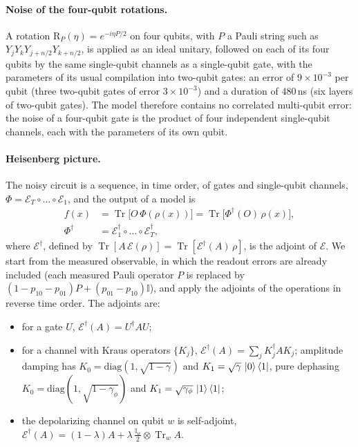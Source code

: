\documentclass[aps,pra,reprint,superscriptaddress,longbibliography]{revtex4-2}
\newcommand{\tr}{\operatorname{Tr}}
\begin{document}
\paragraph{Noise of the four-qubit rotations.} A rotation $\mathrm R_P(\eta)=e^{-i\eta P/2}$ on four qubits, with $P$ a Pauli string such as $Y_jY_kY_{j+n/2}Y_{k+n/2}$, is applied as an ideal unitary, followed on each of its four qubits by the same single-qubit channels as a single-qubit gate, with the parameters of its usual compilation into two-qubit gates: an error of $9\times10^{-3}$ per qubit (three two-qubit gates of error $3\times10^{-3}$) and a duration of $480$\,ns (six layers of two-qubit gates). The model therefore contains no correlated multi-qubit error: the noise of a four-qubit gate is the product of four independent single-qubit channels, each with the parameters of its own qubit.

\paragraph{Heisenberg picture.} The noisy circuit is a sequence, in time order, of gates and single-qubit channels, $\Phi=\mathcal E_T\circ\dots\circ\mathcal E_1$, and the output of a model is
\begin{equation}
\begin{split}
f(x)&=\tr\bigl[O\,\Phi(\rho(x))\bigr]=\tr\bigl[\Phi^\dagger(O)\,\rho(x)\bigr],\\
\Phi^\dagger&=\mathcal E_1^\dagger\circ\dots\circ\mathcal E_T^\dagger ,
\end{split}
\label{eq:heisenberg}
\end{equation}
where $\mathcal E^\dagger$, defined by $\tr[A\,\mathcal E(\rho)]=\tr[\mathcal E^\dagger(A)\,\rho]$, is the adjoint of $\mathcal E$. We start from the measured observable, in which the readout errors are already included (each measured Pauli operator $P$ is replaced by $(1-p_{10}-p_{01})P+(p_{01}-p_{10})\mathbb I$), and apply the adjoints of the operations in reverse time order. The adjoints are:
\begin{itemize}
\item for a gate $U$, $\mathcal E^\dagger(A)=U^\dagger AU$;
\item for a channel with Kraus operators $\{K_j\}$, $\mathcal E^\dagger(A)=\sum_jK_j^\dagger AK_j$; amplitude damping has $K_0=\mathrm{diag}(1,\sqrt{1-\gamma})$ and $K_1=\sqrt\gamma\,\ket0\bra1$, pure dephasing $K_0=\mathrm{diag}(1,\sqrt{1-\gamma_\phi})$ and $K_1=\sqrt{\gamma_\phi}\,\ket1\bra1$;
\item the depolarizing channel on qubit $w$ is self-adjoint, $\mathcal E^\dagger(A)=(1-\lambda)A+\lambda\,\frac{\mathbb I_w}{2}\otimes\tr_w A$.
\end{itemize}
\end{document}

